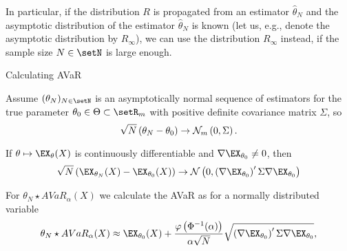 	In particular, if the distribution $R$ is propagated from an estimator $\hat{\theta}_N$ and the asymptotic distribution of the estimator $\hat{\theta}_N$ is known (let us, e.g., denote the asymptotic distribution by $R_\infty$), we can use the distribution $R_\infty$ instead, if the sample size $N\in\setN$ is large enough.





{Calculating AVaR}






	Assume $(\theta_N)_{N \in \setN}$ is an asymptotically normal sequence of estimators for the true parameter $\theta_0 \in \Theta \subset \setR_m$  with positive definite covariance matrix $\Sigma$, so
$$
\sqrt{N}\left(\theta_N -\theta_0\right) \rightarrow {\cal N}_m \left(0,\Sigma\right).
$$


	If $\theta \mapsto \EX_\theta(X)$ is continuously differentiable and $\nabla  \EX_{\theta_0} \not =0$, then
$$
\sqrt{N}\left(\EX_{\theta_N}(X)-\EX_{\theta_0}(X)\right) \rightarrow {\cal N}\left(0, \left(\nabla \EX_{\theta_0}\right)' \Sigma \nabla \EX_{\theta_0}\right)
$$


	For $\theta_N \star AVaR_\alpha(X)$ we calculate the AVaR as for a normally distributed variable
$$
\theta_N \star AVaR_\alpha(X) \approx \EX_{\theta_0}(X) + \frac{\varphi\left(\Phi^{-1}(\alpha)\right)}{\alpha\sqrt{N}} \sqrt{\left(\nabla \EX_{\theta_0}\right)' \Sigma \nabla \EX_{\theta_0}},
$$





